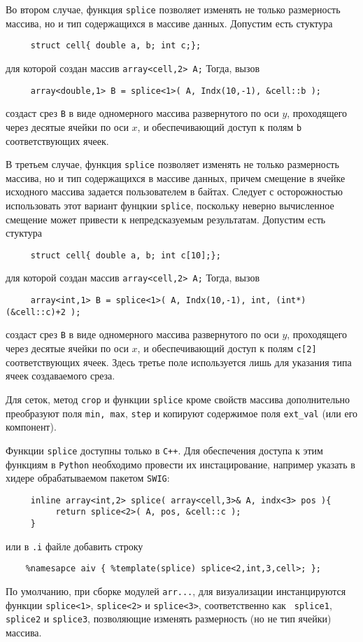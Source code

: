 Во втором случае, функция {\tt splice} позволяет изменять не только
размерность массива, но и тип содержащихся в массиве данных. Допустим есть
стуктура 
\begin{verbatim}
     struct cell{ double a, b; int c;}; 
\end{verbatim}
для которой создан массив
{\tt array<cell,2> A;} Тогда, вызов 
\begin{verbatim}
     array<double,1> B = splice<1>( A, Indx(10,-1), &cell::b );
\end{verbatim}
создаст срез {\tt B} в виде одномерного массива развернутого по оси $y$, проходящего
через десятые ячейки по оси $x$, и обеспечивающий доступ к полям {\tt b}
соответствующих ячеек.

В третьем случае, функция {\tt splice} позволяет изменять не только
размерность массива, но и тип содержащихся в массиве данных, причем смещение в
ячейке исходного массива задается пользователем в байтах. Следует с
осторожностью использовать этот вариант фунцкии {\tt splice}, поскольку
неверно вычисленное смещение может привести к непредсказуемым результатам. Допустим есть
стуктура 
\begin{verbatim}
     struct cell{ double a, b; int c[10];}; 
\end{verbatim}
для которой создан массив
{\tt array<cell,2> A;} Тогда, вызов 
\begin{verbatim}
     array<int,1> B = splice<1>( A, Indx(10,-1), int, (int*)(&cell::c)+2 );
\end{verbatim}
создаст срез {\tt B} в виде одномерного массива развернутого по оси $y$, проходящего
через десятые ячейки по оси $x$, и обеспечивающий доступ к полям {\tt c[2]}
соответствующих ячеек. Здесь третье поле используется лишь для указания типа
ячеек создаваемого среза.

Для сеток, метод {\tt crop} и функции {\tt splice} кроме свойств массива дополнительно преобразуют поля {\tt min,
  max}, {\tt step} и копируют содержимое поля {\tt ext\_val} (или его компонент).

Функции {\tt splice} доступны только в {\tt C++}. Для обеспечения доступа к
этим функциям в {\tt Python} необходимо провести их инстацирование, например
указать в хидере обрабатываемом пакетом {\tt SWIG}:
\begin{verbatim}
     inline array<int,2> splice( array<cell,3>& A, indx<3> pos ){ 
          return splice<2>( A, pos, &cell::c ); 
     }
\end{verbatim}
или в {\tt .i} файле добавить строку 
\begin{verbatim}
    %namesapce aiv { %template(splice) splice<2,int,3,cell>; };
\end{verbatim}
По умолчанию, при сборке модулей {\tt arr...}, для визуализации инстанцируются
функции 
{\tt splice<1>}, {\tt splice<2>} и {\tt splice<3>}, соответственно как {\tt
  splice1}, {\tt splice2} и {\tt splice3}, 
позволяющие изменять размерность (но не тип ячейки) массива.

